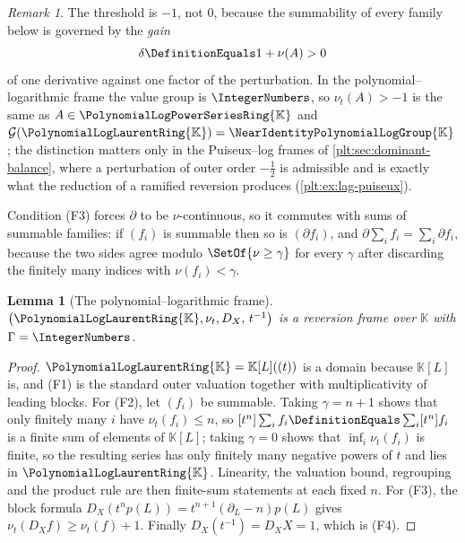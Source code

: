 \documentclass[11pt,oneside]{article}
\theoremstyle{plain}
\newtheorem{lemma}[theorem]{Lemma}
\theoremstyle{definition}
\theoremstyle{remark}
\newtheorem{remark}[theorem]{Remark}
\newcommand{\K}{\mathbb{K}}
\newcommand{\PLpow}{\PolynomialLogPowerSeriesRing{\K}}   %
\newcommand{\PLlau}{\PolynomialLogLaurentRing{\K}}       %
\newcommand{\Gnear}{\NearIdentityPolynomialLogGroup{\K}} %
\newcommand{\ordt}{\nu_{t}}                              %
\newcommand{\DX}{D_{X}}                                  %
\begin{document}
\begin{remark}
\label{plt:rmk:lag-why-minus-one}
The threshold is \(-1\), not \(0\), because the summability of every family
below is governed by the \emph{gain}
\begin{equation}
\label{plt:eq:lag-gain}
  \delta\DefinitionEquals1+\nu(A)>0
\end{equation}
of one derivative against one factor of the perturbation.  In the
polynomial--logarithmic frame the value group is \(\IntegerNumbers\), so
\(\nu_t(A)>-1\) is the same as \(A\in\PLpow\) and
\(\mathcal G(\PLlau)=\Gnear\); the distinction matters only in the
Puiseux--log frames of \cref{plt:sec:dominant-balance}, where a perturbation of
outer order \(-\tfrac12\) is admissible and is exactly what the reduction of a
ramified reversion produces (\cref{plt:ex:lag-puiseux}).
\end{remark}

Condition (F3) forces \(\partial\) to be \(\nu\)-continuous, so it commutes with
sums of summable families: if \((f_i)\) is summable then so is
\((\partial f_i)\), and \(\partial\sum_if_i=\sum_i\partial f_i\), because the two
sides agree modulo \(\SetOf{\nu\ge\gamma}\) for every \(\gamma\) after
discarding the finitely many indices with \(\nu(f_i)<\gamma\).

\begin{lemma}[The polynomial--logarithmic frame]
\label{plt:lem:lag-pl-frame}
\(\bigl(\PLlau,\ordt,\DX,\,t^{-1}\bigr)\) is a reversion frame over \(\K\)
with \(\Gamma=\IntegerNumbers\).
\end{lemma}

\begin{proof}
\(\PLlau=\K[L]((t))\) is a domain because \(\K[L]\) is, and (F1) is the
standard outer valuation together with multiplicativity of leading blocks.
For (F2), let \((f_i)\) be summable.  Taking \(\gamma=n+1\) shows that only
finitely many \(i\) have \(\ordt(f_i)\le n\), so
\([t^n]\sum_if_i\DefinitionEquals\sum_i[t^n]f_i\) is a finite sum of elements of
\(\K[L]\); taking \(\gamma=0\) shows that \(\inf_i\ordt(f_i)\) is finite, so the
resulting series has only finitely many negative powers of \(t\) and lies in
\(\PLlau\).  Linearity, the valuation bound, regrouping and the product rule
are then finite-sum statements at each fixed \(n\).  For (F3), the block
formula \(\DX(t^np(L))=t^{n+1}(\partial_L-n)p(L)\) gives
\(\ordt(\DX f)\ge\ordt(f)+1\).  Finally \(\DX(t^{-1})=\DX X=1\), which is (F4).
\end{proof}
\end{document}

